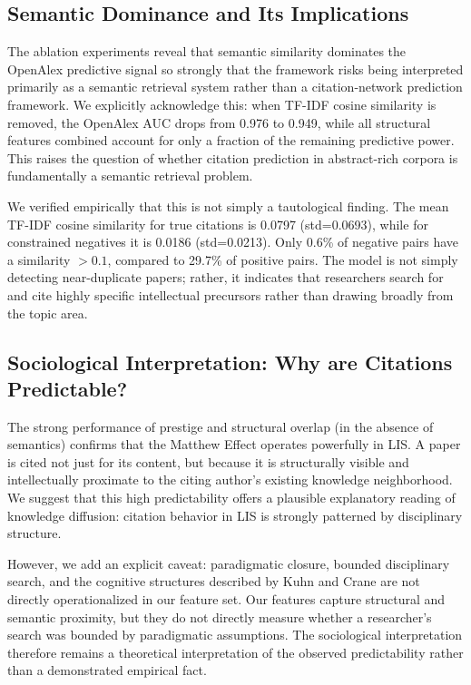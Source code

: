 \documentclass[11pt,a4paper]{article}
\begin{document}
\subsection{Semantic Dominance and Its Implications}
The ablation experiments reveal that semantic similarity dominates the OpenAlex predictive signal so strongly that the framework risks being interpreted primarily as a semantic retrieval system rather than a citation-network prediction framework. We explicitly acknowledge this: when TF-IDF cosine similarity is removed, the OpenAlex AUC drops from 0.976 to 0.949, while all structural features combined account for only a fraction of the remaining predictive power. This raises the question of whether citation prediction in abstract-rich corpora is fundamentally a semantic retrieval problem.

We verified empirically that this is not simply a tautological finding. The mean TF-IDF cosine similarity for true citations is 0.0797 (std=0.0693), while for constrained negatives it is 0.0186 (std=0.0213). Only 0.6\% of negative pairs have a similarity $>0.1$, compared to 29.7\% of positive pairs. The model is not simply detecting near-duplicate papers; rather, it indicates that researchers search for and cite highly specific intellectual precursors rather than drawing broadly from the topic area.

\subsection{Sociological Interpretation: Why are Citations Predictable?}
The strong performance of prestige and structural overlap (in the absence of semantics) confirms that the Matthew Effect operates powerfully in LIS. A paper is cited not just for its content, but because it is structurally visible and intellectually proximate to the citing author's existing knowledge neighborhood. We suggest that this high predictability offers a plausible explanatory reading of knowledge diffusion: citation behavior in LIS is strongly patterned by disciplinary structure.

However, we add an explicit caveat: paradigmatic closure, bounded disciplinary search, and the cognitive structures described by Kuhn \citep{kuhn1962structure} and Crane \citep{crane1972invisible} are not directly operationalized in our feature set. Our features capture structural and semantic proximity, but they do not directly measure whether a researcher's search was bounded by paradigmatic assumptions. The sociological interpretation therefore remains a theoretical interpretation of the observed predictability rather than a demonstrated empirical fact.
\end{document}
